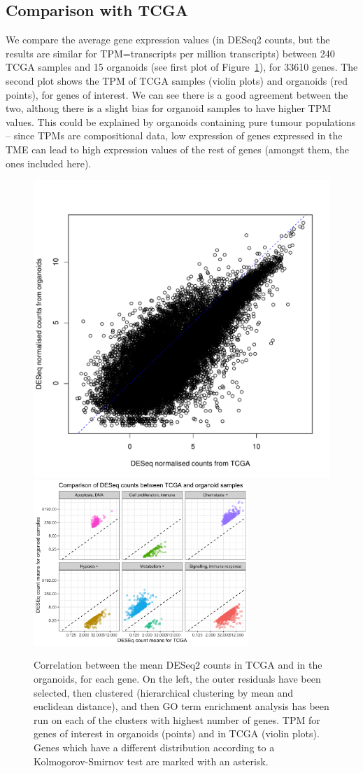 \documentclass{article}
\begin{document}
\clearpage
\subsection{Comparison with TCGA}

We compare the average gene expression values (in DESeq2 counts, but the results are similar for TPM=transcripts per million transcripts) between 240 TCGA samples and 15 organoids (see first plot of Figure~\ref{tcga_org_cor_rnaseq}), for 33610 genes. The second plot shows the TPM of TCGA samples (violin plots) and organoids (red points), for genes of interest. We can see there is a good agreement between the two, althoug there is a slight bias for organoid samples to have higher TPM values. This could be explained by  organoids containing pure tumour populations -- since TPMs are compositional data, low expression of genes expressed in the TME can lead to high expression values of the rest of genes (amongst them, the ones included here).

\begin{figure}[h]
\centering
\includegraphics[width=.42\textwidth]{../../RNASeq_DE_resistant_sensitive/figures/Sensitive_resistant_figures/colmeans_deseqcounts_correlation_tcga_org.pdf}
\includegraphics[width=3.2in]{../../RNASeq_DE_resistant_sensitive/figures/Sensitive_resistant_figures/colmeans_deseqcounts_correlation_tcga_org_GOterms.png}
\caption{Correlation between the mean DESeq2 counts in TCGA and in the organoids, for each gene. On the left, the outer residuals have been selected, then clustered (hierarchical clustering by mean and euclidean distance), and then GO term enrichment analysis has been run on each of the clusters with highest number of genes. TPM for genes of interest in organoids (points) and in TCGA (violin plots). Genes which have a different distribution according to a Kolmogorov-Smirnov test are marked with an asterisk.\label{tcga_org_cor_rnaseq}}
\end{figure}
\end{document}
